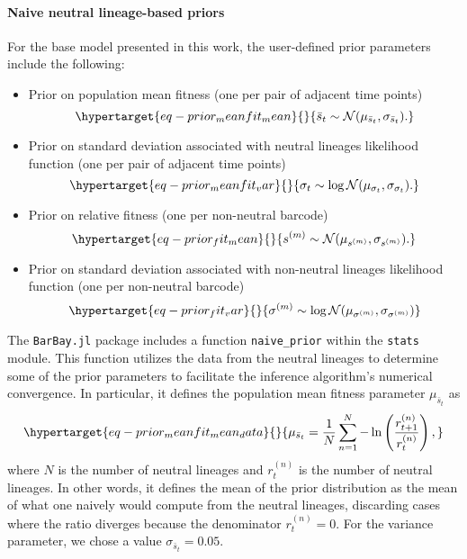 \documentclass[
  letterpaper,
  DIV=11,
  numbers=noendperiod]{scrartcl}
\let\oldparagraph\paragraph
\renewcommand{\paragraph}[1]{\oldparagraph{#1}\mbox{}}
\begin{document}
\begin{refsegment}
\hypertarget{naive-neutral-lineage-based-priors}{%
\paragraph{Naive neutral lineage-based
priors}\label{naive-neutral-lineage-based-priors}}

For the base model presented in this work, the user-defined prior
parameters include the following:

\begin{itemize}
\item
  Prior on population mean fitness (one per pair of adjacent time
  points) \begin{equation}\protect\hypertarget{eq-prior_meanfit_mean}{}{
  \bar{s}_t \sim \mathcal{N}(\mu_{\bar{s}_t}, \sigma_{{\bar{s}_t}}).
  }\label{eq-prior_meanfit_mean}\end{equation}
\item
  Prior on standard deviation associated with neutral lineages
  likelihood function (one per pair of adjacent time points)
  \begin{equation}\protect\hypertarget{eq-prior_meanfit_var}{}{
  \sigma_t \sim \log\mathcal{N}(\mu_{\sigma_t}, \sigma_{\sigma_t}).
  }\label{eq-prior_meanfit_var}\end{equation}
\item
  Prior on relative fitness (one per non-neutral barcode)
  \begin{equation}\protect\hypertarget{eq-prior_fit_mean}{}{
  s^{(m)} \sim \mathcal{N}(\mu_{s^{(m)}}, \sigma_{s^{(m)}}).
  }\label{eq-prior_fit_mean}\end{equation}
\item
  Prior on standard deviation associated with non-neutral lineages
  likelihood function (one per non-neutral barcode)
  \begin{equation}\protect\hypertarget{eq-prior_fit_var}{}{
  \sigma^{(m)} \sim \log\mathcal{N}(\mu_{\sigma^{(m)}}, \sigma_{\sigma^{(m)}})
  }\label{eq-prior_fit_var}\end{equation}
\end{itemize}

The \texttt{BarBay.jl} package includes a function \texttt{naive\_prior}
within the \texttt{stats} module. This function utilizes the data from
the neutral lineages to determine some of the prior parameters to
facilitate the inference algorithm's numerical convergence. In
particular, it defines the population mean fitness parameter
\(\mu_{\bar{s}_t}\) as
\begin{equation}\protect\hypertarget{eq-prior_meanfit_mean_data}{}{
\mu_{\bar{s}_t} = \frac{1}{N} \sum_{n=1}^N 
-\ln\left( \frac{r_{t+1}^{(n)}}{r_t^{(n)}} \right),
}\label{eq-prior_meanfit_mean_data}\end{equation} where \(N\) is the
number of neutral lineages and \(r_t^{(n)}\) is the number of neutral
lineages. In other words, it defines the mean of the prior distribution
as the mean of what one naively would compute from the neutral lineages,
discarding cases where the ratio diverges because the denominator
\(r_t^{(n)} = 0\). For the variance parameter, we chose a value
\(\sigma_{\bar{s}_t} = 0.05\).


\end{refsegment}
\end{document}
